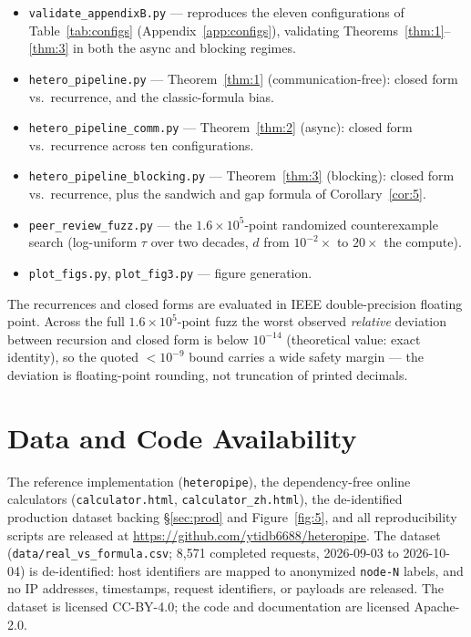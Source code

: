 \documentclass[11pt]{article}
\begin{document}
\begin{itemize}
\item \texttt{validate\_appendixB.py} --- reproduces the eleven configurations of Table~\ref{tab:configs} (Appendix~\ref{app:configs}), validating Theorems~\ref{thm:1}--\ref{thm:3} in both the async and blocking regimes.
\item \texttt{hetero\_pipeline.py} --- Theorem~\ref{thm:1} (communication-free): closed form vs.\ recurrence, and the classic-formula bias.
\item \texttt{hetero\_pipeline\_comm.py} --- Theorem~\ref{thm:2} (async): closed form vs.\ recurrence across ten configurations.
\item \texttt{hetero\_pipeline\_blocking.py} --- Theorem~\ref{thm:3} (blocking): closed form vs.\ recurrence, plus the sandwich and gap formula of Corollary~\ref{cor:5}.
\item \texttt{peer\_review\_fuzz.py} --- the $1.6\times10^5$-point randomized counterexample search (log-uniform $\tau$ over two decades, $d$ from $10^{-2}\times$ to $20\times$ the compute).
\item \texttt{plot\_figs.py}, \texttt{plot\_fig3.py} --- figure generation.
\end{itemize}

The recurrences and closed forms are evaluated in IEEE double-precision floating point. Across the full $1.6\times10^5$-point fuzz the worst observed \emph{relative} deviation between recursion and closed form is below $10^{-14}$ (theoretical value: exact identity), so the quoted $<10^{-9}$ bound carries a wide safety margin --- the deviation is floating-point rounding, not truncation of printed decimals.

\section*{Data and Code Availability}

The reference implementation (\texttt{heteropipe}), the dependency-free online calculators (\texttt{calculator.html}, \texttt{calculator\_zh.html}), the de-identified production dataset backing \S\ref{sec:prod} and Figure~\ref{fig:5}, and all reproducibility scripts are released at \url{https://github.com/ytidb6688/heteropipe}. The dataset (\texttt{data/real\_vs\_formula.csv}; 8,571 completed requests, 2026-09-03 to 2026-10-04) is de-identified: host identifiers are mapped to anonymized \texttt{node-N} labels, and no IP addresses, timestamps, request identifiers, or payloads are released. The dataset is licensed CC-BY-4.0; the code and documentation are licensed Apache-2.0.
\end{document}
